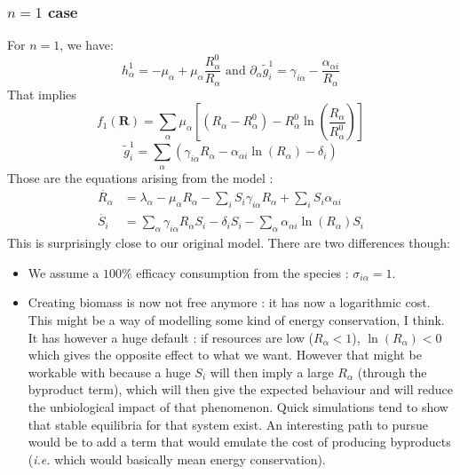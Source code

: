 \documentclass[12pt]{article}
\newcommand{\vect}[1]{\textbf{#1}}
\newcommand{\ie}{\textit{i.e.} }
\begin{document}
\begin{appendices}
		\subsubsection{$n=1$ case}
		For $n=1$, we have:
		\begin{equation}
			h_\alpha^1 = -\mu_\alpha + \mu_\alpha \frac{R_\alpha^0}{R_\alpha} \text{ and } \partial_\alpha \tilde{g}_i^1 = \gamma_{i\alpha} - \frac{\alpha_{\alpha i}}{R_\alpha}
		\end{equation}
		That implies
		\begin{equation}
			f_1 (\vect{R}) = \sum_\alpha \mu_\alpha \left[(R_\alpha-R_\alpha^0)- R_\alpha^0 \ln\left(\frac{R_\alpha}{R_\alpha^0}\right)\right]
		\end{equation}
		\begin{equation}
			\tilde{g}_i^1 = \sum_\alpha\left(\gamma_{i\alpha}R_\alpha-\alpha_{\alpha i}\ln\left(R_{\alpha}\right)-\delta_i\right)
		\end{equation}
		Those are the equations arising from the model :
		\begin{align}
			\dot{R_\alpha} &= \lambda_\alpha - \mu_\alpha R_\alpha - \sum_{i} S_i \gamma_{i\alpha} R_\alpha + \sum_i S_i \alpha_{\alpha i} \\
			\dot{S_i} &= \sum_\alpha \gamma_{i\alpha} R_\alpha S_i - \delta_i S_i- \sum_\alpha \alpha_{\alpha i} \ln\left(R_\alpha\right)S_i 
		\end{align}
		This is surprisingly close to our original model. There are two differences though:
		\begin{itemize}
			\item We assume a $100\%$ efficacy consumption from the species : $\sigma_{i\alpha} = 1$.
			\item Creating biomass is now not free anymore : it has now a logarithmic cost. This might be a way of modelling some kind of energy conservation, I think. It has however a huge default : if resources are low ($R_\alpha < 1$), $\ln\left(R_\alpha\right) < 0$ which gives the opposite effect to what we want. However that might be workable with because a huge $S_i$ will then imply a large $R_\alpha$ (through the byproduct term), which will then give the expected behaviour and will reduce the unbiological impact of that phenomenon.  Quick simulations tend to show that stable equilibria for that system exist. An interesting path to pursue would be to add a term that would emulate the cost of producing byproducts (\ie which would basically mean energy conservation).
		\end{itemize}
		

\end{appendices}
\end{document}
